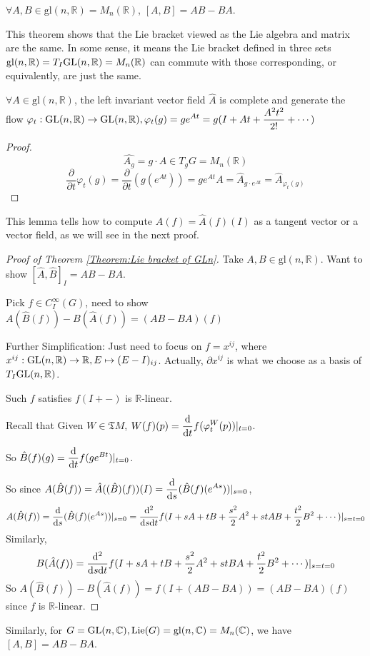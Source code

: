 \begin{theorem}\label{Theorem:Lie bracket of GLn}
     $ \forall A,B\in\mathrm{gl}(n,\mathbb{R})=M_n(\mathbb{R}) $,  $ [A,B]=AB-BA $.  
\end{theorem}
\begin{remark}
    This theorem shows that the Lie bracket viewed as the Lie algebra and matrix are the same. In some sense, it means the Lie bracket defined in three sets  $ \mathrm{gl}(n,\mathbb{R})=T_I\mathrm{GL}(n,\mathbb
    R)=M_n(\mathbb{R}) $ can commute with those corresponding, or equivalently, are just the same. 
\end{remark}
\begin{lemma}
     $ \forall A\in \mathrm{gl}(n,\mathbb{R}) $, the left invariant vector field  $ \hat{A} $ is complete and generate the flow  $ \displaystyle\varphi_t:\mathrm{GL}(n,\mathbb{R})\rightarrow \mathrm{GL}(n,\mathbb{R}), \varphi_t(g)=ge^{At}=g(I+At+\frac{A^2t^2}{2!}+\cdots) $   
\end{lemma}
\begin{proof}
     \[\hat{A_g}=g\cdot A\in T_gG=M_n(\mathbb{R})\]
      \[\frac{\partial}{\partial t}\varphi_t(g)=\frac{\partial}{\partial t}(g(e^{At}))=ge^{At}A=\hat{A}_{g\cdot e^{At}}=\hat{A}_{\varphi_t(g)}\]
\end{proof}
\begin{remark}
     This lemma tells how to compute  $ A(f)=\hat{A}(f)(I) $ as a tangent vector or a vector field, as we will see in the next proof. 
\end{remark}
\begin{proof}[Proof of Theorem \ref{Theorem:Lie bracket of GLn}]
    Take  $ A,B\in \mathrm{gl}(n,\mathbb{R}) $. Want to show  $ [\hat{A},\hat{B}]_I=AB-BA $.
    
    Pick  $ f\in C^\infty_I(G) $, need to show  $ A(\hat{B}(f))-B(\hat{A}(f))=(AB-BA)(f) $
    
    Further Simplification: Just need to focus on  $ f=x^{ij} $, where  $ x^{ij}:\mathrm{GL}(n,\mathbb{R})\rightarrow \mathbb{R}, E\mapsto (E-I)_{ij} $. Actually,  $ \partial x^{ij} $ is what we choose as a basis of  $ T_I\mathrm{GL}(n,\mathbb{R}) $.  
    
    Such  $ f $ satisfies  $ f(I+-) $ is  $ \mathbb{R} $-linear.
    
    Recall that Given  $ W\in \mathfrak{T}M $,  $ W(f)(p)=\displaystyle\frac{\mathrm{d}}{\mathrm{d}t}f(\varphi_t^W(p))|_{t=0} $. 
    
    So  $ \hat{B}(f)(g)=\displaystyle\frac{\mathrm{d}}{\mathrm{d}t}f(ge^{Bt})|_{t=0} $.
    
    So  since  $ A(\hat{B}(f))=\hat{A}((\hat{B})(f))(I)=\displaystyle \frac{\mathrm{d}}{\mathrm{d}s}(\hat{B}(f)(e^{As}))|_{s=0}  $, 
    \[\displaystyle A(\hat{B}(f)) =\frac{\mathrm{d}}{\mathrm{d}s}(\hat{B}(f)(e^{As}))|_{s=0}=\frac{\mathrm{d}^2}{\mathrm{d}s\mathrm{d}t}f(I+sA+tB+\frac{s^2}{2}A^2+stAB+\frac{t^2}{2}B^2+\cdots)|_{s=t=0}\]
    Similarly,
    \[\displaystyle B(\hat{A}(f))=\frac{\mathrm{d}^2}{\mathrm{d}s\mathrm{d}t}f(I+sA+tB+\frac{s^2}{2}A^2+stBA+\frac{t^2}{2}B^2+\cdots)|_{s=t=0}\]
    So $ A(\hat{B}(f))-B(\hat{A}(f))=f(I+(AB-BA))=(AB-BA)(f) $ since  $ f $ is  $ \mathbb{R} $-linear.  
\end{proof}
Similarly, for  $ G=\mathrm{GL}(n,\mathbb{C}), \mathrm{Lie}(G)=\mathrm{gl}(n,\mathbb{C})=M_n(\mathbb{C}) $, we have  $ [A,B]=AB-BA $.
  
